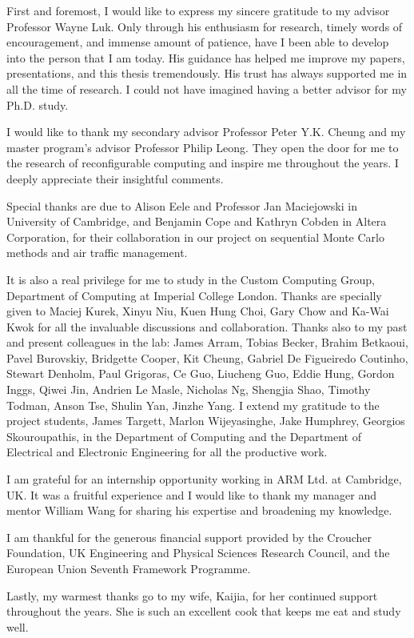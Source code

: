 
\cleardoublepage

{}

\begin{acknowledgements}

First and foremost, I would like to express my sincere gratitude to my advisor Professor Wayne Luk.
Only through his enthusiasm for research, timely words of encouragement, and immense amount of patience, have I been able to develop into the person that I am today.
His guidance has helped me improve my papers, presentations, and this thesis tremendously.
His trust has always supported me in all the time of research.
I could not have imagined having a better advisor for my Ph.D. study.

I would like to thank my secondary advisor Professor Peter Y.K. Cheung and my master program's advisor Professor Philip Leong.
They open the door for me to the research of reconfigurable computing and inspire me throughout the years.
I deeply appreciate their insightful comments.

Special thanks are due to Alison Eele and Professor Jan Maciejowski in University of Cambridge, and Benjamin Cope and Kathryn Cobden in Altera Corporation, for their collaboration in our project on sequential Monte Carlo methods and air traffic management.

It is also a real privilege for me to study in the Custom Computing Group, Department of Computing at Imperial College London.
Thanks are specially given to Maciej Kurek, Xinyu Niu, Kuen Hung Choi, Gary Chow and Ka-Wai Kwok for all the invaluable discussions and collaboration.
Thanks also to my past and present colleagues in the lab: James Arram, Tobias Becker, Brahim Betkaoui, Pavel Burovskiy, Bridgette Cooper, Kit Cheung, Gabriel De Figueiredo Coutinho, Stewart Denholm, Paul Grigoras, Ce Guo, Liucheng Guo, Eddie Hung, Gordon Inggs, Qiwei Jin, Andrien Le Masle, Nicholas Ng, Shengjia Shao, Timothy Todman, Anson Tse, Shulin Yan, Jinzhe Yang.
I extend my gratitude to the project students, James Targett, Marlon Wijeyasinghe, Jake Humphrey, Georgios Skouroupathis, in the Department of Computing and the Department of Electrical and Electronic Engineering for all the productive work.

I am grateful for an internship opportunity working in ARM Ltd. at Cambridge, UK.
It was a fruitful experience and I would like to thank my manager and mentor William Wang for sharing his expertise and broadening my knowledge.

I am thankful for the generous financial support provided by the Croucher Foundation, UK Engineering and Physical Sciences Research Council, and the European Union Seventh Framework Programme.

Lastly, my warmest thanks go to my wife, Kaijia, for her continued support throughout the years.
She is such an excellent cook that keeps me eat and study well.

\end{acknowledgements}
